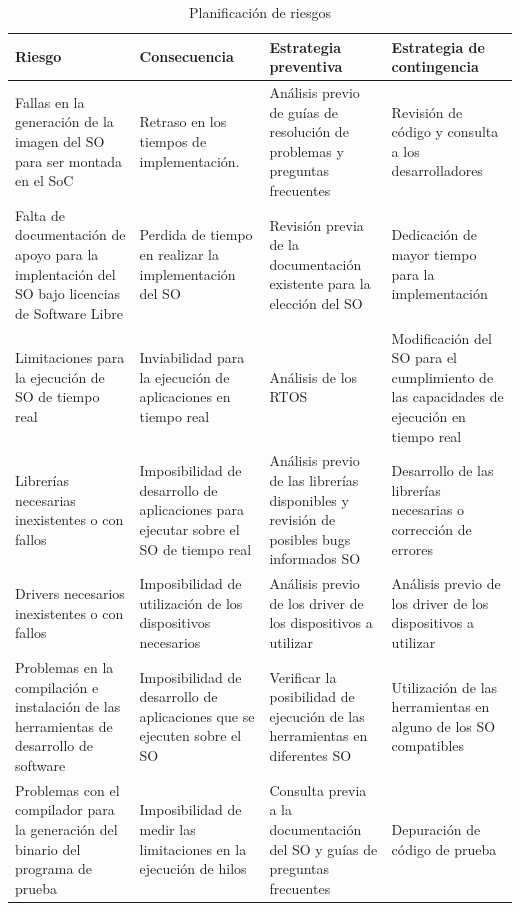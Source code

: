  \begin{table}[h!]
		\centering
		\begin{tabular}{ p{4cm} p{4cm} p{4cm} p{3cm} }
		\hline 
		\rowcolor[gray]{0.8} Riesgo & Consecuencia & Estrategia preventiva & Estrategia de contingencia\\
		\hline
		Fallas en la generación de la imagen del SO para ser montada en el SoC &Retraso en los tiempos de implementación.& Análisis previo de guías de resolución de problemas y preguntas frecuentes & Revisión de código y consulta a los desarrolladores\\		 
		\hline
		Falta de documentación de apoyo para la implentación del SO bajo licencias de Software Libre& Perdida de tiempo en realizar la implementación del SO & Revisión previa de la documentación existente para la elección del
SO & Dedicación de mayor tiempo para la implementación\\ 
		\hline
		 Limitaciones para la ejecución de SO de tiempo real & Inviabilidad para la ejecución
de aplicaciones en tiempo real & Análisis de los RTOS &Modificación del SO para el cumplimiento de las capacidades de ejecución en tiempo real\\
		\hline
		Librerías necesarias inexistentes o con fallos& Imposibilidad de desarrollo de aplicaciones para ejecutar sobre el SO de tiempo real& Análisis previo de las librerías disponibles y revisión de posibles bugs informados SO & Desarrollo de las librerías necesarias o corrección de errores\\			
		\hline
		Drivers necesarios inexistentes o con fallos & Imposibilidad de utilización
de los dispositivos necesarios&Análisis previo de los driver de los dispositivos a utilizar& Análisis previo de los
driver de los dispositivos a utilizar\\		
		\hline
		 Problemas en la compilación e instalación de las herramientas de desarrollo de software & Imposibilidad de desarrollo de aplicaciones que se ejecuten sobre el SO& Verificar la posibilidad de ejecución de las herramientas
en diferentes SO & Utilización de las herramientas en alguno de los SO compatibles\\
		\hline
		 Problemas con el compilador para la generación del binario del programa de prueba& Imposibilidad de medir las limitaciones en la ejecución de hilos & Consulta previa a la documentación del SO y guías de preguntas frecuentes & Depuración de código de prueba\\
		\hline
		\end{tabular}
		\caption{Planificación de riesgos}
		\end{table}

